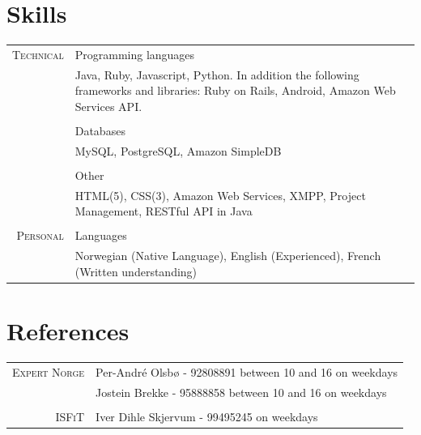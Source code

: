 \documentclass[a4paper,10pt]{article}
\begin{document}
\section{Skills}
\begin{tabular}{r|p{12cm}}
  \textsc{Technical}& Programming languages  \\&\footnotesize{Java, Ruby, Javascript, Python. In addition the following frameworks and libraries: Ruby on Rails, Android, Amazon Web Services API. }
  \\&\par \\& Databases  \\&\footnotesize{MySQL, PostgreSQL, Amazon SimpleDB}
  \\&\par \\& Other  \\&\footnotesize{HTML(5), CSS(3), Amazon Web Services, XMPP, Project Management, RESTful API in Java}
  \\\multicolumn{2}{c}{}\\
  \textsc{Personal}& Languages  \\&\footnotesize{Norwegian (Native Language), English (Experienced), French (Written understanding)}

\end{tabular}

\section{References}
\begin{tabular}{rl}
  \textsc{Expert Norge} & Per-André Olsbø - 92808891 between 10 and 16 on weekdays
  \\& Jostein Brekke - 95888858 between 10 and 16 on weekdays
  \\\multicolumn{2}{c}{}\\
  \textsc{ISFiT}& Iver Dihle Skjervum - 99495245 on weekdays \\
\end{tabular}
\end{document}
